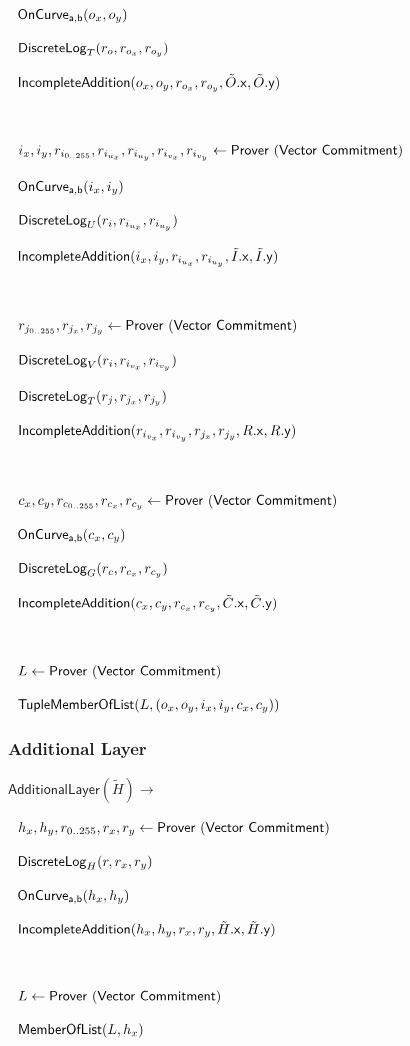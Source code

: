 \documentclass[]{article}
\begin{document}
$~~\mathsf{OnCurve_{a,b}}(o_x, o_y)$

$~~\mathsf{DiscreteLog}_T(r_o, r_{o_x}, r_{o_y})$

$~~\mathsf{IncompleteAddition}(o_x, o_y, r_{o_x}, r_{o_y}, \tilde{O}\mathsf{.x}, \tilde{O}\mathsf{.y})$

$ $

$~~i_x, i_y, r_{i_{0..255}}, r_{i_{u_x}}, r_{i_{u_y}}, r_{i_{v_x}}, r_{i_{v_y}}\leftarrow \mathsf{Prover ~(Vector ~Commitment)}$

$~~\mathsf{OnCurve_{a,b}}(i_x, i_y)$

$~~\mathsf{DiscreteLog}_U(r_i, r_{i_{u_x}}, r_{i_{u_y}})$

$~~\mathsf{IncompleteAddition}(i_x, i_y, r_{i_{u_x}}, r_{i_{u_y}}, \tilde{I}\mathsf{.x}, \tilde{I}\mathsf{.y})$

$ $

$~~r_{j_{0..255}}, r_{j_x}, r_{j_y}\leftarrow \mathsf{Prover ~(Vector ~Commitment)}$

$~~\mathsf{DiscreteLog}_V(r_i, r_{i_{v_x}}, r_{i_{v_y}})$

$~~\mathsf{DiscreteLog}_T(r_j, r_{j_x}, r_{j_y})$

$~~\mathsf{IncompleteAddition}(r_{i_{v_x}}, r_{i_{v_y}}, r_{j_x}, r_{j_y}, R\mathsf{.x}, R\mathsf{.y})$

$ $

$~~c_x, c_y, r_{c_{0..255}}, r_{c_x}, r_{c_y}\leftarrow \mathsf{Prover ~(Vector ~Commitment)}$

$~~\mathsf{OnCurve_{a,b}}(c_x, c_y)$

$~~\mathsf{DiscreteLog}_G(r_c, r_{c_x}, r_{c_y})$

$~~\mathsf{IncompleteAddition}(c_x, c_y, r_{c_x}, r_{c_y}, \tilde{C}\mathsf{.x}, \tilde{C}\mathsf{.y})$

$ $

$~~L\leftarrow \mathsf{Prover ~(Vector ~Commitment)}$

$~~\mathsf{TupleMemberOfList}(L, (o_x, o_y, i_x, i_y, c_x, c_y))$

\subsubsection{Additional Layer}

$\mathsf{AdditionalLayer}(\tilde{H}) \rightarrow$

$~~h_x, h_y, r_{0..255}, r_x, r_y\leftarrow \mathsf{Prover ~(Vector ~Commitment)}$

$~~\mathsf{DiscreteLog}_H(r, r_x, r_y)$

$~~\mathsf{OnCurve_{a,b}}(h_x, h_y)$

$~~\mathsf{IncompleteAddition}(h_x, h_y, r_x, r_y, \tilde{H}\mathsf{.x}, \tilde{H}\mathsf{.y})$

$ $

$~~L\leftarrow \mathsf{Prover ~(Vector ~Commitment)}$

$~~\mathsf{MemberOfList}(L, h_x)$
\end{document}
